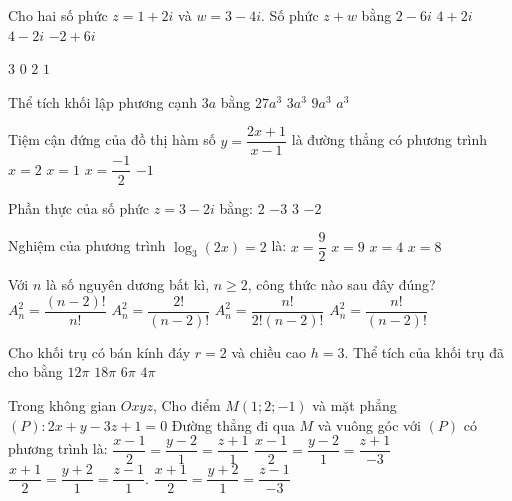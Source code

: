 \begin{ex}%
Cho hai số phức $z=1+2 i$ và $w=3-4 i$. Số phức $z+w$ bằng
\choice
{$2-6 i$}
{$4+2 i$}
{\True $4-2 i$}
{$-2+6 i$}

\end{ex}
\begin{ex}%
{\vspace{-0.5cm}
}
\choice
{\True $3$}
{$0$}
{$2$}
{$1$}
\end{ex}
\begin{ex}%
Thể tích khối lập phương cạnh $3 a$ bằng
\choice
{\True $27 a^3$}
{$3 a^3$}
{$9 a^3$}
{$a^3$}

\end{ex}
\begin{ex}%
Tiệm cận đứng của đồ thị hàm số $y=\dfrac{2 x+1}{x-1}$ là đường thẳng có phương trình
\choice
{$x=2$}
{\True $x=1$}
{$x=\dfrac{-1}{2}$}
{$-1$}

\end{ex}
\begin{ex}%
Phần thực của số phức $z=3-2 i$ bằng:
\choice
{$2$}
{$-3$}
{\True $3$}
{$-2$}

\end{ex}
\begin{ex}%
Nghiệm của phương trình $\log_3(2 x)=2$ là:
\choice
{\True $x=\dfrac{9}{2}$}
{$x=9$}
{$x=4$}
{$x=8$}

\end{ex}
\begin{ex}%
Với $n$ là số nguyên dương bất kì, $n \geq 2$, công thức nào sau đây đúng?
\choice
{$A_n^2=\dfrac{(n-2) !}{n !}$}
{$A_n^2=\dfrac{2!}{(n-2) !}$}
{$A_n^2=\dfrac{n !}{2!(n-2) !}$}
{\True $A_n^2=\dfrac{n !}{(n-2) !}$}

\end{ex}
\begin{ex}%
Cho khối trụ có bán kính đáy $r=2$ và chiều cao $h=3$. Thể tích của khối trụ đã cho bằng
\choice
{\True $12\pi$}
{$18\pi$}
{$6\pi$}
{$4\pi$}

\end{ex}
\begin{ex}%
Trong không gian $O x y z$, Cho điểm $M(1; 2;-1)$ và mặt phẳng $(P)\colon 2 x+y-3 z+1=0$ Đường thẳng đi qua $M$ và vuông góc với $(P)$ có phương trình là:
\choice
{$\dfrac{x-1}{2}=\dfrac{y-2}{1}=\dfrac{z+1}{1}$}
{\True $\dfrac{x-1}{2}=\dfrac{y-2}{1}=\dfrac{z+1}{-3}$}
{$\dfrac{x+1}{2}=\dfrac{y+2}{1}=\dfrac{z-1}{1}$.}
{$\dfrac{x+1}{2}=\dfrac{y+2}{1}=\dfrac{z-1}{-3}$}

\end{ex}
